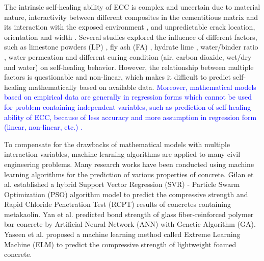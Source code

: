 \documentclass[11pt]{article}
\begin{document}
	The intrinsic self-healing ability of ECC is complex and uncertain due to material nature, interactivity between different composites in the cementitious matrix and its interaction with the exposed environment \cite{wu2012review}, and unpredictable crack location, orientation and width \cite{huang2013characterization}. Several studies explored the influence of different factors, such as limestone powders (LP) \cite{suleiman2019visualization,zhou2008developing}, fly ash (FA) \cite{li2007self,zhang2014investigating}, hydrate lime \cite{yildirim2014influence}, water/binder ratio \cite{yang2005self}, water permeation \cite{sahmaran2007transport} and different curing condition (air, carbon dioxide, wet/dry and water) \cite{qian2010influence} on self-healing behavior. However, the relationship between multiple factors is questionable and non-linear, which makes it difficult to predict self-healing mathematically based on available data. \textcolor{blue}{Moreover, mathematical models based on empirical data are generally in regression forms which cannot be used for problem containing independent variables, such as prediction of self-healing ability of ECC, because of less accuracy and more assumption in regression form (linear, non-linear, etc.) \cite{alshihri2009neural}.}
	
	
	To compensate for the drawbacks of mathematical models with multiple interaction variables, machine learning algorithms are applied to many civil engineering problems. Many research works have been conducted using machine learning algorithms for the prediction of various properties of concrete. Gilan et al.\cite{gilan2012hybrid} established a hybrid Support Vector Regression (SVR) - Particle Swarm Optimization (PSO) algorithm model to predict the compressive strength and Rapid Chloride Penetration Test (RCPT) results of concretes containing metakaolin. Yan et al. \cite{yan2017evaluation} predicted bond strength of glass fiber-reinforced polymer bar concrete by Artificial Neural Network (ANN) with Genetic Algorithm (GA). Yaseen et al.\cite{yaseen2018predicting} proposed a machine learning method called Extreme Learning Machine (ELM) to predict the compressive strength of lightweight foamed concrete. 
	
\end{document}
